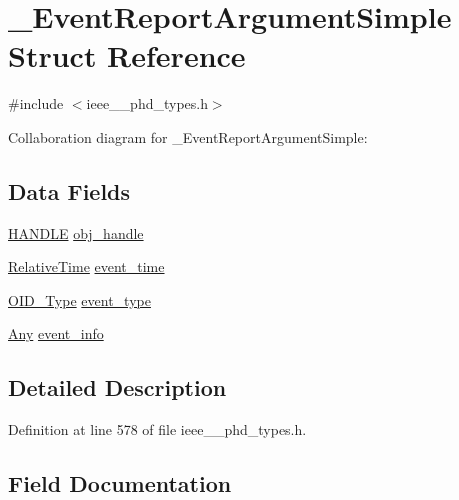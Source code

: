 \hypertarget{struct___event_report_argument_simple}{}\section{\+\_\+\+Event\+Report\+Argument\+Simple Struct Reference}
\label{struct___event_report_argument_simple}


{\ttfamily \#include $<$ieee\+\_\+\_\+phd\+\_\+types.\+h$>$}



Collaboration diagram for \+\_\+\+Event\+Report\+Argument\+Simple\+:
\subsection*{Data Fields}
\begin{DoxyCompactItemize}
\item 
\hyperlink{ieee__11073__phd__types_8h_a76f0d44d294babf2e568f7ee676ffca6}{H\+A\+N\+D\+L\+E} \hyperlink{struct___event_report_argument_simple_abbfff52b7a4956021522f5750c4b32c6}{obj\+\_\+handle}
\item 
\hyperlink{ieee__11073__phd__types_8h_a396922eed4599fd81cd463e5c941eb03}{Relative\+Time} \hyperlink{struct___event_report_argument_simple_ac3c335b8b2c158c440b1473bea905881}{event\+\_\+time}
\item 
\hyperlink{ieee__11073__phd__types_8h_aa4d7af235d4a95d6632aa0d64160dd62}{O\+I\+D\+\_\+\+Type} \hyperlink{struct___event_report_argument_simple_a9291df89a9ec8bde547d68f86d3e6d75}{event\+\_\+type}
\item 
\hyperlink{ieee__11073__phd__types_8h_a4decf91c0c44a2ed84549e41307f5fdb}{Any} \hyperlink{struct___event_report_argument_simple_a1107e2194d047e7435991af97a9fa56c}{event\+\_\+info}
\end{DoxyCompactItemize}


\subsection{Detailed Description}


Definition at line 578 of file ieee\+\_\+\_\+phd\+\_\+types.\+h.



\subsection{Field Documentation}
\hypertarget{struct___event_report_argument_simple_a1107e2194d047e7435991af97a9fa56c}{}
